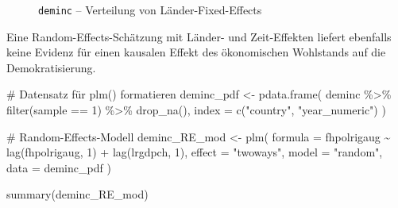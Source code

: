 \documentclass[
  a4paper,
  DIV=11,
  oneside]{scrreprt}
\newenvironment{Shaded}{\begin{snugshade}}{\end{snugshade}}
\newcommand{\AttributeTok}[1]{\textcolor[rgb]{0.40,0.45,0.13}{#1}}
\newcommand{\CommentTok}[1]{\textcolor[rgb]{0.37,0.37,0.37}{#1}}
\newcommand{\DecValTok}[1]{\textcolor[rgb]{0.68,0.00,0.00}{#1}}
\newcommand{\FunctionTok}[1]{\textcolor[rgb]{0.28,0.35,0.67}{#1}}
\newcommand{\NormalTok}[1]{\textcolor[rgb]{0.00,0.23,0.31}{#1}}
\newcommand{\OtherTok}[1]{\textcolor[rgb]{0.00,0.23,0.31}{#1}}
\newcommand{\SpecialCharTok}[1]{\textcolor[rgb]{0.37,0.37,0.37}{#1}}
\newcommand{\StringTok}[1]{\textcolor[rgb]{0.13,0.47,0.30}{#1}}
\begin{document}
\begin{figure}[t]


\caption{\label{fig-acemfig3}\texttt{deminc} -- Verteilung von
Länder-Fixed-Effects}

\end{figure}%

Eine Random-Effects-Schätzung mit Länder- und Zeit-Effekten liefert
ebenfalls keine Evidenz für einen kausalen Effekt des ökonomischen
Wohlstands auf die Demokratisierung.

\begin{Shaded}
\begin{Highlighting}[]
\CommentTok{\# Datensatz für plm() formatieren}
\NormalTok{deminc\_pdf }\OtherTok{\textless{}{-}} \FunctionTok{pdata.frame}\NormalTok{(}
\NormalTok{  deminc }\SpecialCharTok{\%\textgreater{}\%} \FunctionTok{filter}\NormalTok{(sample }\SpecialCharTok{==} \DecValTok{1}\NormalTok{) }\SpecialCharTok{\%\textgreater{}\%} 
    \FunctionTok{drop\_na}\NormalTok{(), }
  \AttributeTok{index =} \FunctionTok{c}\NormalTok{(}\StringTok{"country"}\NormalTok{, }\StringTok{"year\_numeric"}\NormalTok{)   }
\NormalTok{)}

\CommentTok{\# Random{-}Effects{-}Modell}
\NormalTok{deminc\_RE\_mod }\OtherTok{\textless{}{-}} \FunctionTok{plm}\NormalTok{(}
  \AttributeTok{formula =}\NormalTok{ fhpolrigaug }\SpecialCharTok{\textasciitilde{}} 
    \FunctionTok{lag}\NormalTok{(fhpolrigaug, }\DecValTok{1}\NormalTok{) }
  \SpecialCharTok{+} \FunctionTok{lag}\NormalTok{(lrgdpch, }\DecValTok{1}\NormalTok{), }
  \AttributeTok{effect =} \StringTok{"twoways"}\NormalTok{,}
  \AttributeTok{model =} \StringTok{"random"}\NormalTok{,}
  \AttributeTok{data =}\NormalTok{ deminc\_pdf}
\NormalTok{)}

\FunctionTok{summary}\NormalTok{(deminc\_RE\_mod)}
\end{Highlighting}
\end{Shaded}
\end{document}
